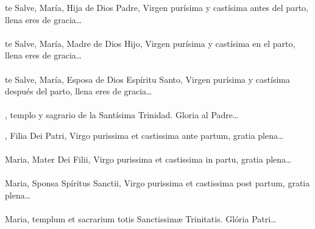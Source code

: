 \documentclass[10pt,a4paper,oneside]{book}
\begin{document}
\medskip

\begin{minipage}[t]{0.475\textwidth}
     te Salve, María, Hija de Dios Padre, Virgen purísima y castísima antes del parto, llena eres de gracia{\ldots}\\\\
    te Salve, María, Madre de Dios Hijo, Virgen purísima y castísima en el parto, llena eres de gracia{\ldots}\\\\
     te Salve, María, Esposa de Dios Espíritu Santo, Virgen purísima y castísima después del parto, llena eres de gracia{\ldots}\\\\
    , templo y sagrario de la Santísima Trinidad. Gloria al Padre{\ldots}
\end{minipage}
\begin{minipage}[t]{0.475\textwidth}
    , Filia Dei Patri, Virgo purissima et castissima ante partum, gratia plena{\ldots}\\\\
     Maria, Mater Dei Filii, Virgo purissima et castissima in partu, gratia plena{\ldots}\\\\
     Maria, Sponsa Spíritus Sanctii, Virgo purissima et castissima post partum, gratia plena{\ldots}\\\\
     Maria, templum et sacrarium totis Sanctissim{\ae} Trinitatis. Glória Patri{\ldots}
\end{minipage}

\bigskip\medskip


\begin{center}
\end{center}
\end{document}
